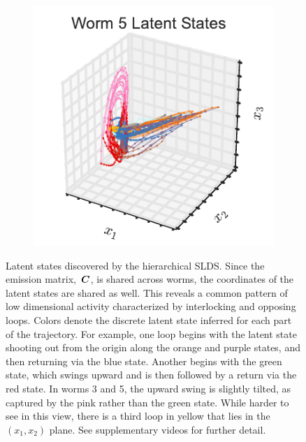 \documentclass{article}
\begin{document}
\begin{figure}[t]
\begin{subfigure}[b]{0.32\linewidth}
  \end{subfigure}  
  \begin{subfigure}[b]{0.32\linewidth}
    \includegraphics[width=\textwidth]{xs_3d_worm4.pdf}
  \end{subfigure}
  \caption{Latent states discovered by the hierarchical SLDS.
    Since the emission matrix,~$\boldsymbol{C}$, is shared across worms, the
    coordinates of the latent states are shared as well. This
    reveals a common pattern of low dimensional activity characterized
    by interlocking and opposing loops. Colors denote the discrete
    latent state inferred for each part of the trajectory. For example,
    one loop begins with the latent state shooting out from the origin
    along the orange and purple states, and then returning via the blue
    state. Another begins with the green state, which swings upward and
    is then followed by a return via the red state. In worms 3 and 5,
    the upward swing is slightly tilted, as captured by the pink 
    rather than the green state. While harder to see in this view, there
    is a third loop in yellow that lies in the~$(x_1, x_2)$ plane.
    See supplementary videos for further detail.
  }
\label{fig:hslds_trajectory}
\end{figure}
\end{document}
